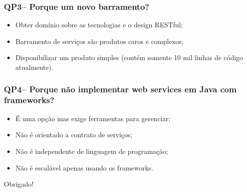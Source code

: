 \documentclass{beamer}
\begin{document}
\begin{frame}
  \frametitle{QP3-- Porque um novo barramento?}

	  \begin{itemize}
		\item<1->Obter domínio sobre as tecnologias e o design RESTful;
		\item<1->Barramento de serviços são produtos caros e complexos;
		\item<1->Disponibilizar um produto simples (contém somente 10 mil linhas de código atualmente).
					
	   \end{itemize}
  
\end{frame}


\begin{frame}
  \frametitle{QP4-- Porque não implementar web services em Java com frameworks?}

	  \begin{itemize}
		\item<1->É uma opção mas exige ferramentas para gerenciar;
		\item<1->Não é orientado a contrato de serviços;
		\item<1->Não é independente de linguagem de programação;
		\item<1->Não é escalável apenas usando os frameworks.
	   \end{itemize}
  
\end{frame}



\begin{frame}[c]{ }
\centering
  \huge{Obrigado!}
\end{frame}
\end{document}
